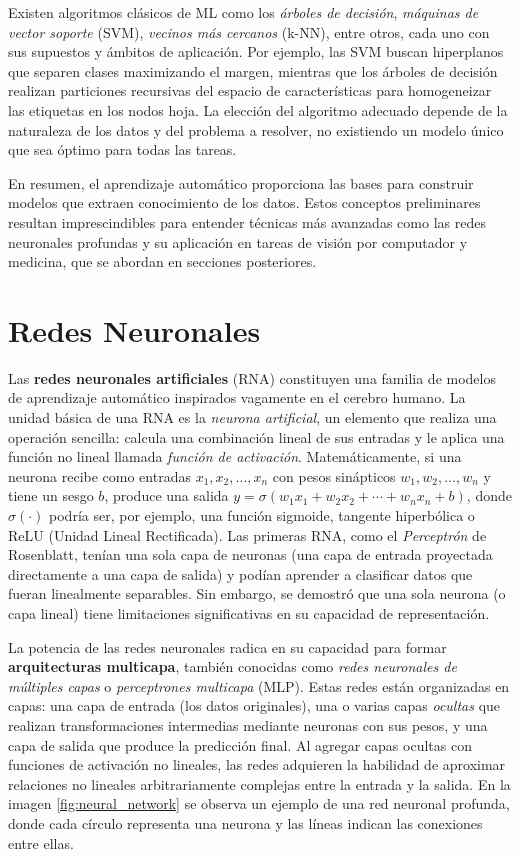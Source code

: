 \documentclass[11pt,spanish,listoffigures,listoftables]{tfgetsinf}
\begin{document}
Existen algoritmos clásicos de ML como los \textit{árboles de decisión}, \textit{máquinas de vector soporte} (SVM), \textit{vecinos más cercanos} (k-NN), entre otros,
cada uno con sus supuestos y ámbitos de aplicación. Por ejemplo, las SVM buscan hiperplanos que separen clases maximizando el margen, mientras que los árboles de 
decisión realizan particiones recursivas del espacio de características para homogeneizar las etiquetas en los nodos hoja. La elección del algoritmo adecuado depende 
de la naturaleza de los datos y del problema a resolver, no existiendo un modelo único que sea óptimo para todas las tareas.

En resumen, el aprendizaje automático proporciona las bases para construir modelos que extraen conocimiento de los datos. Estos conceptos preliminares resultan 
imprescindibles para entender técnicas más avanzadas como las redes neuronales profundas y su aplicación en tareas de visión por computador y medicina, que se 
abordan en secciones posteriores.

\section{Redes Neuronales}\label{sec:nn} 

Las \textbf{redes neuronales artificiales} (RNA) constituyen una familia de modelos de aprendizaje automático inspirados vagamente en el cerebro humano. 
La unidad básica de una RNA es la \textit{neurona artificial}, un elemento que realiza una operación sencilla: calcula una combinación lineal de sus entradas y 
le aplica una función no lineal llamada \textit{función de activación}. Matemáticamente, si una neurona recibe como entradas $x_1, x_2, \dots, x_n$ con pesos 
sinápticos $w_1, w_2, \dots, w_n$ y tiene un sesgo $b$, produce una salida $y = \sigma(w_1 x_1 + w_2 x_2 + \cdots + w_n x_n + b)$, donde $\sigma(\cdot)$ podría ser, 
por ejemplo, una función sigmoide, tangente hiperbólica o ReLU (Unidad Lineal Rectificada). Las primeras RNA, como el \textit{Perceptrón} de Rosenblatt,  tenían una 
sola capa de neuronas (una capa de entrada proyectada directamente a una capa de salida) y podían aprender a clasificar datos que fueran linealmente separables. 
Sin embargo, se demostró que una sola neurona (o capa lineal) tiene limitaciones significativas en su capacidad de representación.

La potencia de las redes neuronales radica en su capacidad para formar \textbf{arquitecturas multicapa}, también conocidas como \textit{redes neuronales de múltiples capas} 
o \textit{perceptrones multicapa} (MLP). Estas redes están organizadas en capas: una capa de entrada (los datos originales), una o varias capas \textit{ocultas} que 
realizan transformaciones intermedias mediante neuronas con sus pesos, y una capa de salida que produce la predicción final. Al agregar capas ocultas con funciones de 
activación no lineales, las redes adquieren la habilidad de aproximar relaciones no lineales arbitrariamente complejas entre la entrada y la salida. En la imagen
\ref{fig:neural_network} se observa un ejemplo de una red neuronal profunda, donde cada círculo representa una neurona y las líneas indican las conexiones entre ellas.
\end{document}
